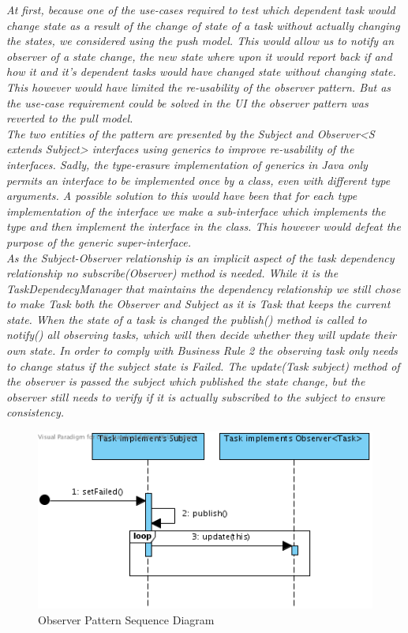				\emph{At first, because one of the use-cases required to test which dependent task would change state as a result of the change of state of a task without actually changing the states, we considered using the push model. This would allow us to notify an observer of a state change, the new state where upon it would report back if and how it and it's dependent tasks would have changed state without changing state. This however would have limited the re-usability of the observer pattern. But as the use-case requirement could be solved in the UI the observer pattern was reverted to the pull model.\\
				The two entities of the pattern are presented by the Subject and Observer<S extends Subject> interfaces using generics to improve re-usability of the interfaces. Sadly, the type-erasure implementation of generics in Java only permits an interface to be implemented once by a class, even with different type arguments. A possible solution to this would have been that for each type implementation of the interface we make a sub-interface which implements the type and then implement the interface in the class. This however would defeat the purpose of the generic super-interface.\\
				As the Subject-Observer relationship is an implicit aspect of the task dependency relationship no subscribe(Observer) method is needed. While it is the TaskDependecyManager that maintains the dependency relationship we still chose to make Task both the Observer and Subject as it is Task that keeps the current state. When the state of a task is changed the publish() method is called to notify() all observing tasks, which will then decide whether they will update their own state. In order to comply with Business Rule 2 the observing task only needs to change status if the subject state is Failed. The update(Task subject) method of the observer is passed the subject which published the state change, but the observer still needs to verify if it is actually subscribed to the subject to ensure consistency.}

				\begin{figure}[H]
					\begin{center}
						\includegraphics[scale=0.7]{images/Observer_Pattern.png}
					\end{center}
					\caption{Observer Pattern Sequence Diagram}
				\end{figure}
				
